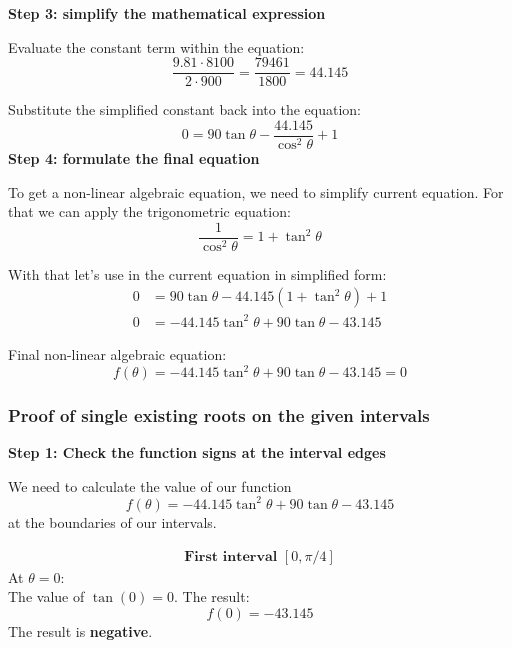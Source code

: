 \documentclass{article}
\begin{document}
\noindent \textbf{Step 3: simplify the mathematical expression}

Evaluate the constant term within the equation:
\begin{equation}
    \frac{9.81 \cdot 8100}{2 \cdot 900} = \frac{79461}{1800} = 44.145
\end{equation}

Substitute the simplified constant back into the equation:
\begin{equation}
    0 = 90 \tan\theta - \frac{44.145}{\cos^2\theta} + 1
\end{equation}
\newpage
\noindent \textbf{Step 4: formulate the final equation}

To get a non-linear algebraic equation, we need to simplify current equation. For that we can apply the trigonometric equation:
\begin{equation}
\frac{1}{\cos^2\theta} = 1 + \tan^2\theta
\end{equation}

With that let's use in the current equation in simplified form:
\begin{align}
    0 &= 90 \tan\theta - 44.145(1 + \tan^2\theta) + 1 \\
    0 &= -44.145 \tan^2\theta + 90 \tan\theta - 43.145
\end{align}

Final non-linear algebraic equation:
\begin{equation}
    f(\theta) = -44.145 \tan^2\theta + 90 \tan\theta - 43.145 = 0
\end{equation}

\subsubsection{Proof of single existing roots on the given intervals}

\noindent \textbf{Step 1: Check the function signs at the interval edges}

\noindent We need to calculate the value of our function
\begin{equation}
f(\theta) = -44.145 \tan^2\theta + 90 \tan\theta - 43.145
\end{equation}
at the boundaries of our intervals.

\begin{align*}
    \textbf{First interval $[0, \pi/4]$}
\end{align*}
At $\theta = 0$: \\
The value of $\tan(0) = 0$. The result:
\begin{equation}
f(0) = -43.145
\end{equation}
The result is \textbf{negative}.
\end{document}
